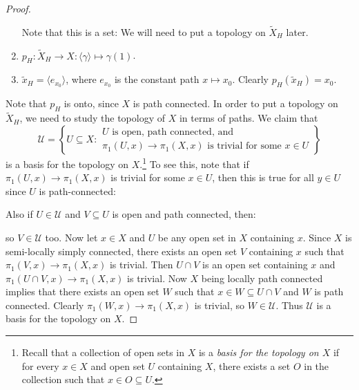\begin{proof}
\begin{enumerate}
      Note that this is a set: We will need to put a
      topology on $\widetilde{X}_H$ later.
    \item $p_H : \widetilde{X}_H \to X : \langle \gamma \rangle \mapsto \gamma(1)$.
    \item $\widetilde{x}_H = \langle e_{x_0} \rangle$,
      where $e_{x_0}$ is the constant path $x \mapsto x_0$.
      Clearly $p_H(\widetilde{x}_H) = x_0$.
  \end{enumerate}
  Note that $p_H$ is onto, since $X$ is path connected.
  In order to put a topology on $\widetilde{X}_H$, we need to
  study the topology of $X$ in terms of paths. We claim that
  \[
    \mathcal{U} = \left\{
    U \subseteq X : \substack{\displaystyle\text{$U$ is open, path connected, and} \\ \displaystyle\text{$\pi_1(U, x) \to \pi_1(X, x)$ is trivial for some $x \in U$}}
    \right\}
  \]
  is a basis for the topology on $X$.\footnote{Recall that a collection of open sets in $X$ is a \emph{basis for the topology on $X$} if for every $x \in X$ and open set $U$ containing $X$, there exists a set $O$ in the collection such that $x \in O \subseteq U$.}
  To see this, note that if $\pi_1(U, x) \to \pi_1(X, x)$
  is trivial for some $x \in U$, then this is true
  for all $y \in U$ since $U$ is path-connected:
  \begin{center}
  \end{center}
  Also if $U \in \mathcal{U}$ and $V \subseteq U$ is open
  and path connected, then:
  \begin{center}
  \end{center}
  so $V \in \mathcal{U}$ too. Now let $x \in X$ and
  $U$ be any open set in $X$ containing $x$. Since
  $X$ is semi-locally simply connected, there exists an
  open set $V$ containing $x$ such that
  $\pi_1(V, x) \to \pi_1(X, x)$ is trivial. Then
  $U \cap V$ is an open set containing $x$ and
  $\pi_1(U \cap V, x) \to \pi_1(X, x)$ is trivial.
  Now $X$ being locally path connected implies that there
  exists an open set $W$ such that $x \in W \subseteq U \cap V$
  and $W$ is path connected. Clearly
  $\pi_1(W, x) \to \pi_1(X, x)$ is trivial, so
  $W \in \mathcal{U}$. Thus $\mathcal{U}$ is a basis
  for the topology on $X$.


\end{proof}
